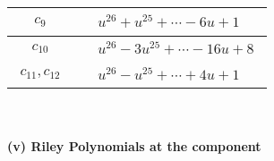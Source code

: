 \documentclass[1p]{elsarticle_modified}
\theoremstyle{definition}
\begin{document}
\begin{tabular}{m{50pt}|m{274pt}}
\hline $$\begin{aligned}c_{9}\end{aligned}$$&$\begin{aligned}
&u^{26}+u^{25}+\cdots-6 u+1
\end{aligned}$\\
\hline $$\begin{aligned}c_{10}\end{aligned}$$&$\begin{aligned}
&u^{26}-3 u^{25}+\cdots-16 u+8
\end{aligned}$\\
\hline $$\begin{aligned}c_{11},c_{12}\end{aligned}$$&$\begin{aligned}
&u^{26}- u^{25}+\cdots+4 u+1
\end{aligned}$\\
\hline
\end{tabular}\\~\\
\newpage\renewcommand{\arraystretch}{1}
\flushleft \textbf{(v) Riley Polynomials at the component}\newline \\
\end{document}
